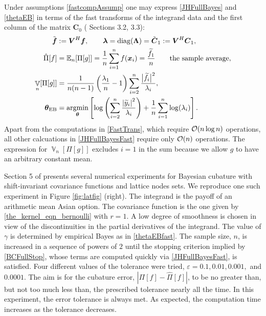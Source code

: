 \documentclass[sts]{imsart}
\numberwithin{equation}{section}
\theoremstyle{plain}
\newcommand{\vC}{\boldsymbol{C}}
\DeclareMathOperator{\Var}{\mathbb{V}}
\newcommand{\JH}{\citetalias{RatHic19a}}%
\newcommand{\vLambda}{\boldsymbol{\Lambda}}
\begin{document}
Under assumptions \eqref{fastcompAssump} one may express \eqref{JHFullBayes} and \eqref{thetaEB} in terms of the fast transforms of the integrand data and the first column of the matrix $\vC_0$ (\JH{} Sections 3.2, 3.3):
\begin{subequations} \label{JHFullBayesFast}
\begin{align}
\label{FastTrans}
\tvf & : = \vV^{H} \vf, \qquad \vlambda = \diag(\vLambda) = \tilde{\vC}_1 := \vV^{H} \vC_1, \\
    \hat{\Pi}[f] & =  \Ex_n[\Pi[g]] = \frac 1n \sum_{i=1}^n f(\vx_i) = \frac{\tf_1}{n} \qquad \text{the sample average},\\
\Var_n[\Pi[g]] & = \frac{1}{n(n-1)} \left(\frac{\lambda_1}{n}  - 1  \right)\sum_{i=2}^n \frac{\bigl \lvert \tf_i\bigr \rvert^2}{\lambda_i} , \\
\label{thetaEBfast}
\vtheta_{\textup{EB}} &= 
\argmin_{\vtheta}
\left[
\log\left(
\sum_{i=2}^n \frac{\abs{\widetilde{y}_i}^2}{\lambda_i}
\right)  
  + 
\frac{1}{n}\sum_{i=1}^n \log(\lambda_i)
\right].
\end{align}
\end{subequations}
Apart from the computations in \eqref{FastTrans}, which require $\operatorname{{\mathcal O}}(n \log n)$ operations, all other calcuations in \eqref{JHFullBayesFast} require only $\operatorname{{\mathcal O}}(n)$ operations.  The expression for $\Var_n[\Pi[g]]$ excludes $i=1$ in the sum because we allow $g$ to have an arbitrary constant mean.

Section 5 of \JH{} presents several numerical experiments for Bayesian cubature with shift-invariant covariance functions and lattice nodes sets.  We reproduce one such experiment in Figure \ref{fig:latfig} (right).  The integrand is the payoff of an arithmetic mean Asian option.  The covariance function is the one given by \eqref{the_kernel_eqn_bernoulli} with $r=1$.  A low degree of smoothness is chosen in view of the discontinuities in the partial derivatives of the integrand.  The value of $\gamma$ is determined by empirical Bayes as in \eqref{thetaEBfast}.  The sample size, $n$, is increased in a sequence of powers of $2$ until the stopping criterion implied by \eqref{BCFullStop}, whose terms are computed quickly via \eqref{JHFullBayesFast}, is satisfied.  Four different values of the tolerance were tried, $\varepsilon = 0.1, 0.01, 0.001,$ and $0.0001$. The aim is for the cubature error, $|\Pi[f] - \hat{\Pi}[f]|$, to be no greater than, but not too much less than, the prescribed tolerance nearly all the time.  In this experiment, the error tolerance is always met.  As expected, the computation time increases as the tolerance decreases.  
\end{document}
